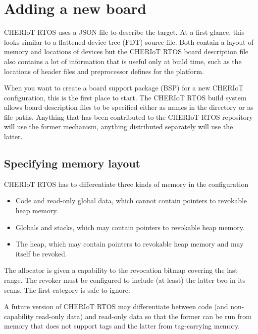 \chapter{Adding a new board}

CHERIoT RTOS uses a JSON file to describe the target.
At a first glance, this looks similar to a flattened device tree (FDT) source file.
Both contain a layout of memory and locations of devices but the CHERIoT RTOS board description file also contains a lot of information that is useful only at build time, such as the locations of header files and preprocessor defines for the platform.

When you want to create a board support package (BSP) for a new CHERIoT configuration, this is the first place to start.
The CHERIoT RTOS build system allows board description files to be specified either as names in the  directory or as file paths.
Anything that has been contributed to the CHERIoT RTOS repository will use the former mechanism, anything distributed separately will use the latter.

\section{Specifying memory layout}

CHERIoT RTOS has to differentiate three kinds of memory in the configuration

\begin{itemize}
	\item{Code and read-only global data, which cannot contain pointers to revokable heap memory.}
	\item{Globals and stacks, which may contain pointers to revokable heap memory.}
	\item{The heap, which may contain pointers to revokable heap memory and may itself be revoked.}
\end{itemize}

The allocator is given a capability to the revocation bitmap covering the last range.
The revoker must be configured to include (at least) the latter two in its scans.
The first category is safe to ignore.

\begin{note}
A future version of CHERIoT RTOS may differentiate between code (and non-capability read-only data) and read-only data so that the former can be run from memory that does not support tags and the latter from tag-carrying memory.
\end{note}

